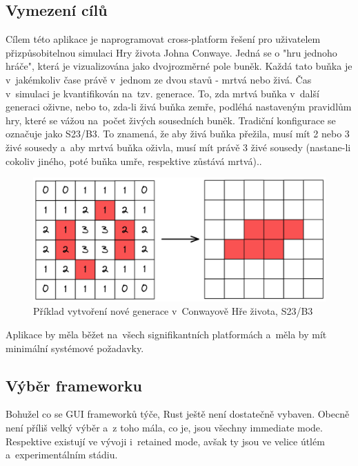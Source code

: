 \documentclass[a4paper, 12pt]{article} %
\begin{document}
    \subsection{Vymezení cílů}
        Cílem této aplikace je naprogramovat cross-platform řešení pro uživatelem přizpůsobitelnou simulaci Hry života Johna Conwaye. Jedná se o "hru jednoho hráče", která je vizualizována jako dvojrozměrné pole buněk. Každá tato buňka je v~jakémkoliv čase právě v~jednom ze dvou stavů - mrtvá nebo živá. Čas v~simulaci je kvantifikován na~tzv. generace. To, zda mrtvá buňka v~další generaci oživne, nebo to, zda-li živá buňka zemře, podléhá nastaveným pravidlům hry, které se vážou na~počet živých sousedních buněk. Tradiční konfigurace se označuje jako S23/B3. To znamená, že aby živá buňka přežila, musí mít 2 nebo 3 živé sousedy a~aby mrtvá buňka oživla, musí mít právě 3 živé sousedy (nastane-li cokoliv jiného, poté buňka umře, respektive zůstává mrtvá).\cite{conway}.
        \begin{center}
            \begin{figure}[H]
                \centering
                \includegraphics[width=.82\linewidth]{conway}
                \caption{Příklad vytvoření nové generace v~Conwayově Hře života, S23/B3}
                \label{fig:conway}
            \end{figure}
        \end{center}
    
        Aplikace by měla běžet na~všech signifikantních platformách a~měla by mít minimální systémové požadavky.
    
    \subsection{Výběr frameworku}
        Bohužel co se GUI frameworků týče, Rust ještě není dostatečně vybaven. Obecně není příliš velký výběr a~z toho mála, co je, jsou všechny immediate mode. Respektive existují ve vývoji i~retained mode, avšak ty jsou ve velice útlém a~experimentálním stádiu.
\end{document}

